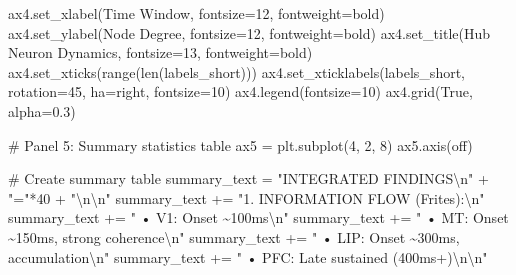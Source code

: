 \documentclass[
  11pt,
  letterpaper,
  oneside,
  openany]{book}
\newenvironment{Shaded}{\begin{snugshade}}{\end{snugshade}}
\newcommand{\BuiltInTok}[1]{\textcolor[rgb]{0.00,0.23,0.31}{#1}}
\newcommand{\CharTok}[1]{\textcolor[rgb]{0.13,0.47,0.30}{#1}}
\newcommand{\CommentTok}[1]{\textcolor[rgb]{0.37,0.37,0.37}{#1}}
\newcommand{\DecValTok}[1]{\textcolor[rgb]{0.68,0.00,0.00}{#1}}
\newcommand{\FloatTok}[1]{\textcolor[rgb]{0.68,0.00,0.00}{#1}}
\newcommand{\NormalTok}[1]{\textcolor[rgb]{0.00,0.23,0.31}{#1}}
\newcommand{\OperatorTok}[1]{\textcolor[rgb]{0.37,0.37,0.37}{#1}}
\newcommand{\StringTok}[1]{\textcolor[rgb]{0.13,0.47,0.30}{#1}}
\newcommand{\VariableTok}[1]{\textcolor[rgb]{0.07,0.07,0.07}{#1}}
\begin{document}
\begin{Shaded}
\begin{Highlighting}[]
\NormalTok{ax4.set\_xlabel(}\StringTok{\textquotesingle{}Time Window\textquotesingle{}}\NormalTok{, fontsize}\OperatorTok{=}\DecValTok{12}\NormalTok{, fontweight}\OperatorTok{=}\StringTok{\textquotesingle{}bold\textquotesingle{}}\NormalTok{)}
\NormalTok{ax4.set\_ylabel(}\StringTok{\textquotesingle{}Node Degree\textquotesingle{}}\NormalTok{, fontsize}\OperatorTok{=}\DecValTok{12}\NormalTok{, fontweight}\OperatorTok{=}\StringTok{\textquotesingle{}bold\textquotesingle{}}\NormalTok{)}
\NormalTok{ax4.set\_title(}\StringTok{\textquotesingle{}Hub Neuron Dynamics\textquotesingle{}}\NormalTok{, fontsize}\OperatorTok{=}\DecValTok{13}\NormalTok{, fontweight}\OperatorTok{=}\StringTok{\textquotesingle{}bold\textquotesingle{}}\NormalTok{)}
\NormalTok{ax4.set\_xticks(}\BuiltInTok{range}\NormalTok{(}\BuiltInTok{len}\NormalTok{(labels\_short)))}
\NormalTok{ax4.set\_xticklabels(labels\_short, rotation}\OperatorTok{=}\DecValTok{45}\NormalTok{, ha}\OperatorTok{=}\StringTok{\textquotesingle{}right\textquotesingle{}}\NormalTok{, fontsize}\OperatorTok{=}\DecValTok{10}\NormalTok{)}
\NormalTok{ax4.legend(fontsize}\OperatorTok{=}\DecValTok{10}\NormalTok{)}
\NormalTok{ax4.grid(}\VariableTok{True}\NormalTok{, alpha}\OperatorTok{=}\FloatTok{0.3}\NormalTok{)}

\CommentTok{\# Panel 5: Summary statistics table}
\NormalTok{ax5 }\OperatorTok{=}\NormalTok{ plt.subplot(}\DecValTok{4}\NormalTok{, }\DecValTok{2}\NormalTok{, }\DecValTok{8}\NormalTok{)}
\NormalTok{ax5.axis(}\StringTok{\textquotesingle{}off\textquotesingle{}}\NormalTok{)}

\CommentTok{\# Create summary table}
\NormalTok{summary\_text }\OperatorTok{=} \StringTok{"INTEGRATED FINDINGS}\CharTok{\textbackslash{}n}\StringTok{"} \OperatorTok{+} \StringTok{"="}\OperatorTok{*}\DecValTok{40} \OperatorTok{+} \StringTok{"}\CharTok{\textbackslash{}n\textbackslash{}n}\StringTok{"}
\NormalTok{summary\_text }\OperatorTok{+=} \StringTok{"1. INFORMATION FLOW (Frites):}\CharTok{\textbackslash{}n}\StringTok{"}
\NormalTok{summary\_text }\OperatorTok{+=} \StringTok{"   • V1: Onset \textasciitilde{}100ms}\CharTok{\textbackslash{}n}\StringTok{"}
\NormalTok{summary\_text }\OperatorTok{+=} \StringTok{"   • MT: Onset \textasciitilde{}150ms, strong coherence}\CharTok{\textbackslash{}n}\StringTok{"}
\NormalTok{summary\_text }\OperatorTok{+=} \StringTok{"   • LIP: Onset \textasciitilde{}300ms, accumulation}\CharTok{\textbackslash{}n}\StringTok{"}
\NormalTok{summary\_text }\OperatorTok{+=} \StringTok{"   • PFC: Late sustained (400ms+)}\CharTok{\textbackslash{}n\textbackslash{}n}\StringTok{"}


\end{Highlighting}
\end{Shaded}
\end{document}
